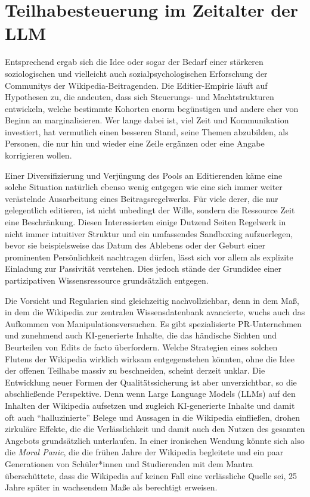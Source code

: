 \documentclass[a4paper,
fontsize=11pt,
oneside,
numbers=noperiodatend,
parskip=half-,
bibliography=totoc,
final
]{scrartcl}
\begin{document}
\section{Teilhabesteuerung im Zeitalter der
LLM}\label{teilhabesteuerung-im-zeitalter-der-llm}

Entsprechend ergab sich die Idee oder sogar der Bedarf einer stärkeren
soziologischen und vielleicht auch sozialpsychologischen Erforschung der
Communitys der Wikipedia-Beitragenden. Die Editier-Empirie läuft auf
Hypothesen zu, die andeuten, dass sich Steuerungs- und Machtstrukturen
entwickeln, welche bestimmte Kohorten enorm begünstigen und andere eher
von Beginn an marginalisieren. Wer lange dabei ist, viel Zeit und
Kommunikation investiert, hat vermutlich einen besseren Stand, seine
Themen abzubilden, als Personen, die nur hin und wieder eine Zeile
ergänzen oder eine Angabe korrigieren wollen.

Einer Diversifizierung und Verjüngung des Pools an Editierenden käme
eine solche Situation natürlich ebenso wenig entgegen wie eine sich
immer weiter verästelnde Ausarbeitung eines Beitragsregelwerks. Für
viele derer, die nur gelegentlich editieren, ist nicht unbedingt der
Wille, sondern die Ressource Zeit eine Beschränkung. Diesen
Interessierten einige Dutzend Seiten Regelwerk in nicht immer intuitiver
Struktur und ein umfassendes Sandboxing aufzuerlegen, bevor sie
beispielsweise das Datum des Ablebens oder der Geburt einer prominenten
Persönlichkeit nachtragen dürfen, lässt sich vor allem als explizite
Einladung zur Passivität verstehen. Dies jedoch stände der Grundidee
einer partizipativen Wissensressource grundsätzlich entgegen.

Die Vorsicht und Regularien sind gleichzeitig nachvollziehbar, denn in
dem Maß, in dem die Wikipedia zur zentralen Wissensdatenbank avancierte,
wuchs auch das Aufkommen von Manipulationsversuchen. Es gibt
spezialisierte PR-Unternehmen und zunehmend auch KI-generierte Inhalte,
die das händische Sichten und Beurteilen von Edits de facto überfordern.
Welche Strategien eines solchen Flutens der Wikipedia wirklich wirksam
entgegenstehen könnten, ohne die Idee der offenen Teilhabe massiv zu
beschneiden, scheint derzeit unklar. Die Entwicklung neuer Formen der
Qualitätssicherung ist aber unverzichtbar, so die abschließende
Perspektive. Denn wenn Large Language Models (LLMs) auf den Inhalten der
Wikipedia aufsetzen und zugleich KI-generierte Inhalte und damit oft
auch \enquote{halluzinierte} Belege und Aussagen in die Wikipedia
einfließen, drohen zirkuläre Effekte, die die Verlässlichkeit und damit
auch den Nutzen des gesamten Angebots grundsätzlich unterlaufen. In
einer ironischen Wendung könnte sich also die \emph{Moral Panic}, die
die frühen Jahre der Wikipedia begleitete und ein paar Generationen von
Schüler*innen und Studierenden mit dem Mantra überschüttete, dass die
Wikipedia auf keinen Fall eine verlässliche Quelle sei, 25 Jahre später
in wachsendem Maße als berechtigt erweisen.
\end{document}
